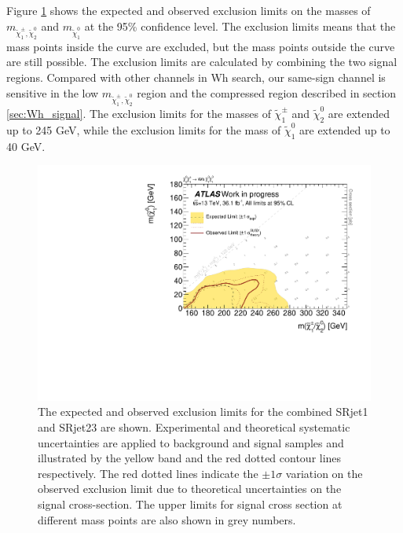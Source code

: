 Figure \ref{fig:result_exclusion_limit} shows the expected and observed exclusion limits on the masses of $m_{\tilde{\chi}_1^\pm, \tilde{\chi}_2^0}$ and $m_{\tilde{\chi}_1^0}$ at the 95\% confidence level.
The exclusion limits means that the mass points inside the curve are excluded, but the mass points outside the curve are still possible.
The exclusion limits are calculated by combining the two signal regions.
Compared with other channels in Wh search, our same-sign channel is sensitive in the low $m_{\tilde{\chi}_1^\pm, \tilde{\chi}_2^0}$ region and the compressed region described in section \ref{sec:Wh_signal}.
The exclusion limits for the masses of $\tilde{\chi}_1^\pm$ and $\tilde{\chi}_2^0$ are extended up to 245 GeV, while the exclusion limits for the mass of $\tilde{\chi}_1^0$ are extended up to 40 GeV.

\begin{figure}[htbp]
\centering
\includegraphics[width=\textwidth]{data/plot/HistFitterResults/contourPlotterWhSS_upperLimit.pdf}
\caption{The expected and observed exclusion limits for the combined SRjet1 and SRjet23 are shown. Experimental and theoretical systematic uncertainties are applied to background and signal samples and illustrated by the yellow band and the red dotted contour lines respectively. The red dotted lines indicate the $\pm 1 \sigma$ variation on the observed exclusion limit due to theoretical uncertainties on the signal cross-section. The upper limits for signal cross section at different mass points are also shown in grey numbers.}
\label{fig:result_exclusion_limit}
\end{figure}

%

